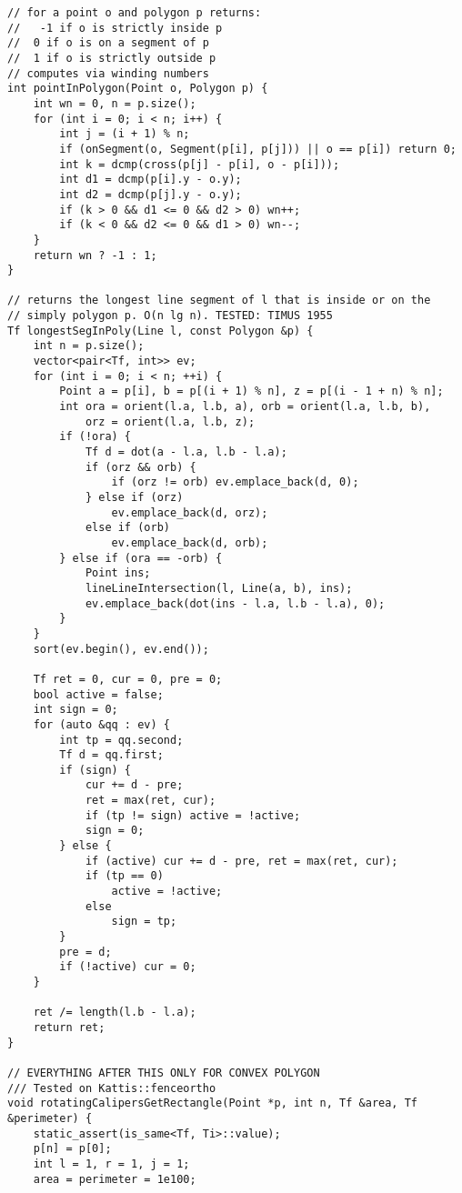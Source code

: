 \documentclass[10pt,a4paper,onesided]{article}
\begin{document}
\begin{multicols*}{3}
\begin{lstlisting}
// for a point o and polygon p returns:
//   -1 if o is strictly inside p
//  0 if o is on a segment of p
//  1 if o is strictly outside p
// computes via winding numbers
int pointInPolygon(Point o, Polygon p) {
    int wn = 0, n = p.size();
    for (int i = 0; i < n; i++) {
        int j = (i + 1) % n;
        if (onSegment(o, Segment(p[i], p[j])) || o == p[i]) return 0;
        int k = dcmp(cross(p[j] - p[i], o - p[i]));
        int d1 = dcmp(p[i].y - o.y);
        int d2 = dcmp(p[j].y - o.y);
        if (k > 0 && d1 <= 0 && d2 > 0) wn++;
        if (k < 0 && d2 <= 0 && d1 > 0) wn--;
    }
    return wn ? -1 : 1;
}

// returns the longest line segment of l that is inside or on the
// simply polygon p. O(n lg n). TESTED: TIMUS 1955
Tf longestSegInPoly(Line l, const Polygon &p) {
    int n = p.size();
    vector<pair<Tf, int>> ev;
    for (int i = 0; i < n; ++i) {
        Point a = p[i], b = p[(i + 1) % n], z = p[(i - 1 + n) % n];
        int ora = orient(l.a, l.b, a), orb = orient(l.a, l.b, b),
            orz = orient(l.a, l.b, z);
        if (!ora) {
            Tf d = dot(a - l.a, l.b - l.a);
            if (orz && orb) {
                if (orz != orb) ev.emplace_back(d, 0);
            } else if (orz)
                ev.emplace_back(d, orz);
            else if (orb)
                ev.emplace_back(d, orb);
        } else if (ora == -orb) {
            Point ins;
            lineLineIntersection(l, Line(a, b), ins);
            ev.emplace_back(dot(ins - l.a, l.b - l.a), 0);
        }
    }
    sort(ev.begin(), ev.end());

    Tf ret = 0, cur = 0, pre = 0;
    bool active = false;
    int sign = 0;
    for (auto &qq : ev) {
        int tp = qq.second;
        Tf d = qq.first;
        if (sign) {
            cur += d - pre;
            ret = max(ret, cur);
            if (tp != sign) active = !active;
            sign = 0;
        } else {
            if (active) cur += d - pre, ret = max(ret, cur);
            if (tp == 0)
                active = !active;
            else
                sign = tp;
        }
        pre = d;
        if (!active) cur = 0;
    }

    ret /= length(l.b - l.a);
    return ret;
}

// EVERYTHING AFTER THIS ONLY FOR CONVEX POLYGON
/// Tested on Kattis::fenceortho
void rotatingCalipersGetRectangle(Point *p, int n, Tf &area, Tf &perimeter) {
    static_assert(is_same<Tf, Ti>::value);
    p[n] = p[0];
    int l = 1, r = 1, j = 1;
    area = perimeter = 1e100;


\end{lstlisting}
\end{multicols*}
\end{document}
